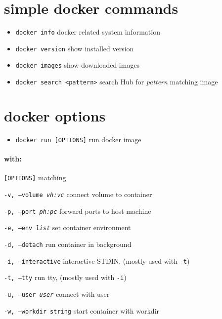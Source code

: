 \documentclass[landscape]{article}
\begin{document}
\begin{multicols*}{3}
\section*{simple docker commands}
\begin{itemize}
	\item \texttt{docker info}
	\subitem \textsf{docker related system information}
	\item \texttt{docker version}
	\subitem \textsf{show installed version}
	\item \texttt{docker images}
	\subitem \textsf{show downloaded images}
	\item \texttt{docker search <pattern>}
	\subitem \textsf{search Hub for \textit{pattern} matching image}
\end{itemize}

\section*{docker options}
\begin{itemize}
	\item \texttt{docker run [OPTIONS]}
	\subitem \textsf{run docker image}
\end{itemize}
\paragraph*{with:} \texttt{[OPTIONS]} matching
\begin{description}
	\item \texttt{-v, --volume \textit{vh:vc}}
	\subitem \textsf{connect volume to container}
	\item \texttt{-p, --port \textit{ph:pc}}
	\subitem \textsf{forward ports to host machine}
	\item \texttt{-e, --env \textit{list}}
	\subitem \textsf{set container environment}
	\item \texttt{-d, --detach}
	\subitem \textsf{run container in background}
	\item \texttt{-i, --interactive}
	\subitem \textsf{interactive STDIN, (mostly used with \texttt{-t})}
	\item \texttt{-t, --tty}
	\subitem \textsf{run tty, (mostly used with \texttt{-i})}
	\item \texttt{-u, --user \textit{user}}
	\subitem \textsf{connect with user}
	\item \texttt{-w, --workdir \texttt{string}}
	\subitem \textsf{start container with workdir}
\end{description}


\end{multicols*}
\end{document}
